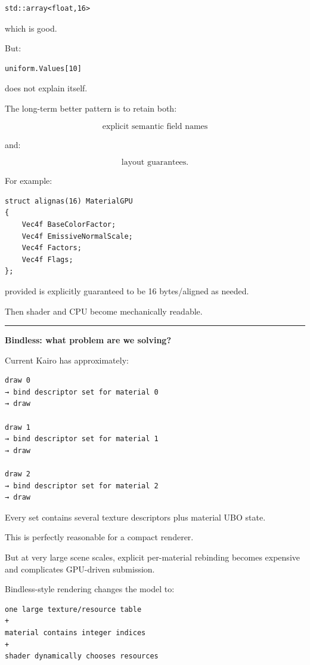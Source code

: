 \begin{verbatim}
std::array<float,16>
\end{verbatim}

which is good.

But:

\begin{verbatim}
uniform.Values[10]
\end{verbatim}

does not explain itself.

The long-term better pattern is to retain both:

\[
\text{explicit semantic field names}
\]

and:

\[
\text{layout guarantees}.
\]

For example:

\begin{verbatim}
struct alignas(16) MaterialGPU
{
    Vec4f BaseColorFactor;
    Vec4f EmissiveNormalScale;
    Vec4f Factors;
    Vec4f Flags;
};
\end{verbatim}

provided  is explicitly guaranteed to be 16 bytes/aligned as needed.

Then shader and CPU become mechanically readable.

\begin{center}\rule{0.5\linewidth}{0.5pt}\end{center}

\textbf{Bindless: what problem are we solving?}

Current Kairo has approximately:

\begin{verbatim}
draw 0
→ bind descriptor set for material 0
→ draw

draw 1
→ bind descriptor set for material 1
→ draw

draw 2
→ bind descriptor set for material 2
→ draw
\end{verbatim}

Every set contains several texture descriptors plus material UBO state.

This is perfectly reasonable for a compact renderer.

But at very large scene scales, explicit per-material rebinding becomes expensive and complicates GPU-driven submission.

Bindless-style rendering changes the model to:

\begin{verbatim}
one large texture/resource table
+
material contains integer indices
+
shader dynamically chooses resources
\end{verbatim}

